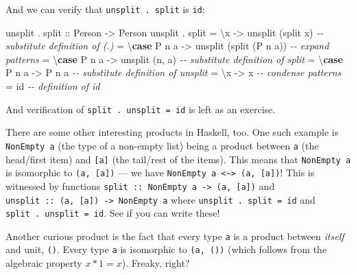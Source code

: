 \documentclass[]{article}
\newenvironment{Shaded}{}{}
\newcommand{\CommentTok}[1]{\textcolor[rgb]{0.38,0.63,0.69}{\textit{#1}}}
\newcommand{\DataTypeTok}[1]{\textcolor[rgb]{0.56,0.13,0.00}{#1}}
\newcommand{\FunctionTok}[1]{\textcolor[rgb]{0.02,0.16,0.49}{#1}}
\newcommand{\KeywordTok}[1]{\textcolor[rgb]{0.00,0.44,0.13}{\textbf{#1}}}
\newcommand{\NormalTok}[1]{#1}
\newcommand{\OperatorTok}[1]{\textcolor[rgb]{0.40,0.40,0.40}{#1}}
\newcommand{\OtherTok}[1]{\textcolor[rgb]{0.00,0.44,0.13}{#1}}
\begin{document}
And we can verify that \texttt{unsplit\ .\ split} is \texttt{id}:

\begin{Shaded}
\begin{Highlighting}[]
\NormalTok{unsplit }\OperatorTok{.}\OtherTok{ split ::} \DataTypeTok{Person} \OtherTok{{-}\textgreater{}} \DataTypeTok{Person}
\NormalTok{unsplit }\OperatorTok{.}\NormalTok{ split}
    \OtherTok{=}\NormalTok{ \textbackslash{}x          }\OtherTok{{-}\textgreater{}}\NormalTok{ unsplit (split x)        }\CommentTok{{-}{-} substitute definition of (.)}
    \OtherTok{=}\NormalTok{ \textbackslash{}}\KeywordTok{case} \DataTypeTok{P}\NormalTok{ n a }\OtherTok{{-}\textgreater{}}\NormalTok{ unsplit (split (}\DataTypeTok{P}\NormalTok{ n a))  }\CommentTok{{-}{-} expand patterns}
    \OtherTok{=}\NormalTok{ \textbackslash{}}\KeywordTok{case} \DataTypeTok{P}\NormalTok{ n a }\OtherTok{{-}\textgreater{}}\NormalTok{ unsplit (n, a)           }\CommentTok{{-}{-} substitute definition of split}
    \OtherTok{=}\NormalTok{ \textbackslash{}}\KeywordTok{case} \DataTypeTok{P}\NormalTok{ n a }\OtherTok{{-}\textgreater{}} \DataTypeTok{P}\NormalTok{ n a                    }\CommentTok{{-}{-} substitute definition of unsplit}
    \OtherTok{=}\NormalTok{ \textbackslash{}x      }\OtherTok{{-}\textgreater{}}\NormalTok{ x                            }\CommentTok{{-}{-} condense patterns}
    \OtherTok{=} \FunctionTok{id}                                      \CommentTok{{-}{-} definition of id}
\end{Highlighting}
\end{Shaded}

And verification of \texttt{split\ .\ unsplit\ =\ id} is left as an exercise.

There are some other interesting products in Haskell, too. One such example is
\texttt{NonEmpty\ a} (the type of a non-empty list) being a product between
\texttt{a} (the head/first item) and \texttt{{[}a{]}} (the tail/rest of the
items). This means that \texttt{NonEmpty\ a} is isomorphic to
\texttt{(a,\ {[}a{]})} --- we have
\texttt{NonEmpty\ a\ \textless{}\textasciitilde{}\textgreater{}\ (a,\ {[}a{]})}!
This is witnessed by functions
\texttt{split\ ::\ NonEmpty\ a\ -\textgreater{}\ (a,\ {[}a{]})} and
\texttt{unsplit\ ::\ (a,\ {[}a{]})\ -\textgreater{}\ NonEmpty\ a} where
\texttt{unsplit\ .\ split\ =\ id} and \texttt{split\ .\ unsplit\ =\ id}. See if
you can write these!

Another curious product is the fact that every type \texttt{a} is a product
between \emph{itself} and unit, \texttt{()}. Every type \texttt{a} is isomorphic
to \texttt{(a,\ ())} (which follows from the algebraic property \(x * 1 = x\)).
Freaky, right?
\end{document}
